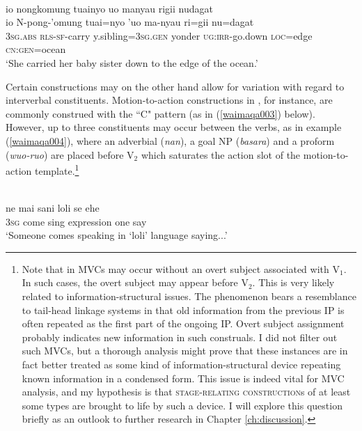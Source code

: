 \ea  \label{pendau016}
\\
\glll io nongkomung tuainyo uo manyau rigii nudagat \\
io N-pong-'omung tuai=nyo 'uo ma-nyau ri=gii nu=dagat \\
3\textsc{sg}.\textsc{abs} \textsc{rls}-\textsc{sf}-carry y.sibling=3\textsc{sg}.\textsc{gen} yonder \textsc{ug}:\textsc{irr}-go.down \textsc{loc}=edge \textsc{cn}:\textsc{gen}=ocean \\
\glft `She carried her baby sister down to the edge of the ocean.'\\
\z

Certain constructions may on the other hand allow for variation with regard to interverbal constituents. Motion-to-action constructions in , for instance, are commonly construed with the ``C" pattern (as in (\ref{waimaqa003}) below). However, up to three constituents may occur between the verbs, as in example (\ref{waimaqa004}), where an adverbial (\textit{nan}), a goal NP (\textit{basara}) and a proform (\textit{wuo-ruo}) are placed before V$_2$ which saturates the action slot of the motion-to-action template.\footnote{Note that in  MVCs may occur without an overt subject associated with V$_1$. In such cases, the overt subject may appear before V$_2$. This is very likely related to information-structural issues. The phenomenon bears a resemblance to tail-head linkage systems in that old information from the previous IP is often repeated as the first part of the ongoing IP. Overt subject assignment probably indicates new information in such construals. I did not filter out such MVCs, but a thorough analysis might prove that these instances are in fact better treated as some kind of information-structural device repeating known information in a condensed form. This issue is indeed vital for MVC analysis, and my hypothesis is that \textsc{stage-relating construction}s of at least some types are brought to life by such a device. I will explore this question briefly as an outlook to further research in Chapter \ref{ch:discussion}.}

\ea \label{waimaqa003}
\\
\gll ne mai sani loli se ehe \\
3\textsc{sg} come sing expression one say \\
\glft `Someone comes speaking in `loli' language saying...'\\ 
\z

